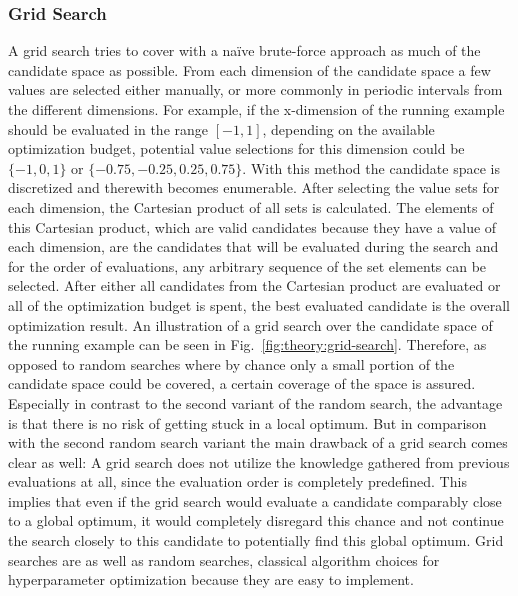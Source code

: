 \subsubsection{Grid Search}
\label{sec:theory:optimization:search:grid}
A grid search tries to cover with a na\"ive brute-force approach as much of the candidate space as possible.
From each dimension of the candidate space a few values are selected either manually, or more commonly in periodic intervals from the different dimensions.
For example, if the x-dimension of the running example should be evaluated in the range $[-1,1]$, depending on the available optimization budget, potential value selections for this dimension could be $\{-1,0,1\}$ or $\{-0.75,-0.25,0.25,0.75\}$.
With this method the candidate space is discretized and therewith becomes enumerable.\newline
After selecting the value sets for each dimension, the Cartesian product of all sets is calculated.
The elements of this Cartesian product, which are valid candidates because they have a value of each dimension, are the candidates that will be evaluated during the search and for the order of evaluations, any arbitrary sequence of the set elements can be selected.
After either all candidates from the Cartesian product are evaluated or all of the optimization budget is spent, the best evaluated candidate is the overall optimization result.
An illustration of a grid search over the candidate space of the running example can be seen in Fig.~\ref{fig:theory:grid-search}.\newline
Therefore, as opposed to random searches where by chance only a small portion of the candidate space could be covered, a certain coverage of the space is assured.
Especially in contrast to the second variant of the random search, the advantage is that there is no risk of getting stuck in a local optimum.
But in comparison with the second random search variant the main drawback of a grid search comes clear as well: A grid search does not utilize the knowledge gathered from previous evaluations at all, since the evaluation order is completely predefined.
This implies that even if the grid search would evaluate a candidate comparably close to a global optimum, it would completely disregard this chance and not continue the search closely to this candidate to potentially find this global optimum.\newline
Grid searches are as well as random searches, classical algorithm choices for hyperparameter optimization because they are easy to implement.\newline
